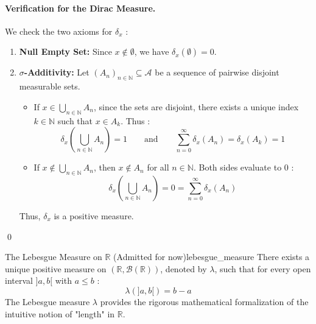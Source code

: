 \paragraph{Verification for the Dirac Measure.}
We check the two axioms for $\delta_x$ :
\begin{enumerate}[label=(\roman*)]
    \item \textbf{Null Empty Set:} Since $x \notin \emptyset$, we have $\delta_x(\emptyset) = 0$.
    \item \textbf{$\sigma$-Additivity:} Let $(A_n)_{n \in \mathbb{N}} \subseteq \mathcal{A}$ be a sequence of pairwise disjoint measurable sets.
    \begin{itemize}
        \item If $x \in \bigcup_{n \in \mathbb{N}} A_n$, since the sets are disjoint, there exists a unique index $k \in \mathbb{N}$ such that $x \in A_k$. Thus :
        \[
            \delta_x\left( \bigcup_{n \in \mathbb{N}} A_n \right) = 1 \qquad \text{and} \qquad \sum_{n=0}^\infty \delta_x(A_n) = \delta_x(A_k) = 1
        \]
        \item If $x \notin \bigcup_{n \in \mathbb{N}} A_n$, then $x \notin A_n$ for all $n \in \mathbb{N}$. Both sides evaluate to $0$ :
        \[
            \delta_x\left( \bigcup_{n \in \mathbb{N}} A_n \right) = 0 = \sum_{n=0}^\infty \delta_x(A_n)
        \]
    \end{itemize}
    Thus, $\delta_x$ is a positive measure.
\end{enumerate}
\qed

\vspace{1.2em}


\begin{example}{The Lebesgue Measure on $\mathbb{R}$ (Admitted for now)}{lebesgue_measure}
There exists a unique positive measure on $(\mathbb{R}, \mathcal{B}(\mathbb{R}))$, denoted by $\lambda$, such that for every open interval $]a, b[$ with $a \le b$ :
\[
    \lambda(]a, b[) = b - a
\]
The Lebesgue measure $\lambda$ provides the rigorous mathematical formalization of the intuitive notion of "length" in $\mathbb{R}$.
\end{example}



